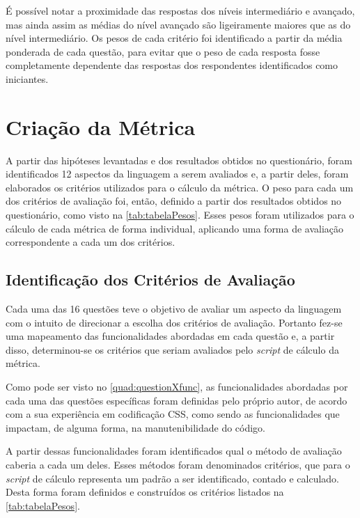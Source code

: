 É possível notar a proximidade das respostas dos níveis intermediário e avançado, mas ainda assim as médias do nível avançado são ligeiramente maiores que as do nível intermediário. Os pesos de cada critério foi identificado a partir da média ponderada de cada questão, para evitar que o peso de cada resposta fosse completamente dependente das respostas dos respondentes identificados como iniciantes.

\section{Criação da Métrica}
	
A partir das hipóteses levantadas e dos resultados obtidos no questionário, foram identificados 12 aspectos da linguagem a serem avaliados e, a partir deles, foram elaborados os critérios utilizados para o cálculo da métrica. O peso para cada um dos critérios de avaliação foi, então, definido a partir dos resultados obtidos no questionário, como visto na \autoref{tab:tabelaPesos}. Esses pesos foram utilizados para o cálculo de cada métrica de forma individual, aplicando uma forma de avaliação correspondente a cada um dos critérios.



\subsection{Identificação dos Critérios de Avaliação}
  
Cada uma das 16 questões teve o objetivo de avaliar um aspecto da linguagem com o intuito de direcionar a escolha dos critérios de avaliação. Portanto fez-se uma mapeamento das funcionalidades abordadas em cada questão e, a partir disso, determinou-se os critérios que seriam avaliados pelo \textit{script} de cálculo da métrica.

Como pode ser visto no \autoref{quad:questionXfunc}, as funcionalidades abordadas por cada uma das questões específicas foram definidas pelo próprio autor, de acordo com a sua experiência em codificação CSS, como sendo as funcionalidades que impactam, de alguma forma, na manutenibilidade do código.



A partir dessas funcionalidades foram identificados qual o método de avaliação caberia a cada um deles. Esses métodos foram denominados critérios, que para o \textit{script} de cálculo representa um padrão a ser identificado, contado e calculado. Desta forma foram definidos e construídos os critérios listados na \autoref{tab:tabelaPesos}.

